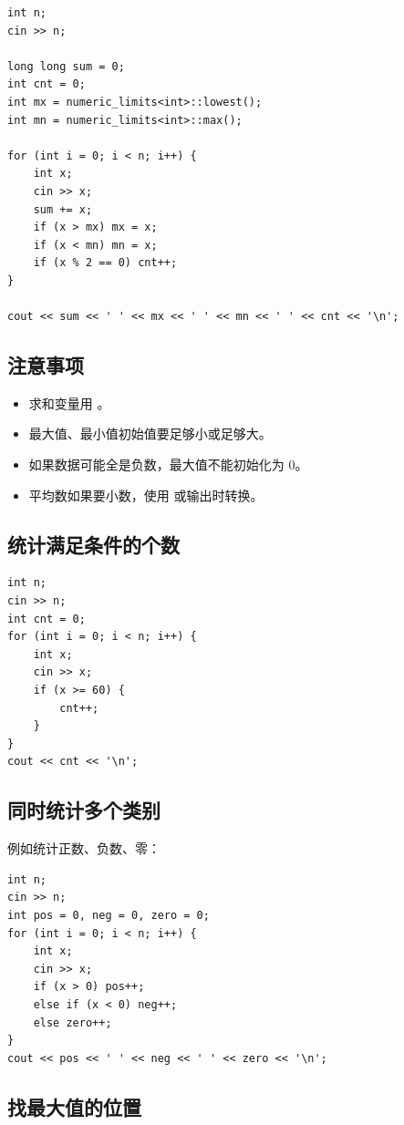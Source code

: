 \begin{lstlisting}
int n;
cin >> n;

long long sum = 0;
int cnt = 0;
int mx = numeric_limits<int>::lowest();
int mn = numeric_limits<int>::max();

for (int i = 0; i < n; i++) {
    int x;
    cin >> x;
    sum += x;
    if (x > mx) mx = x;
    if (x < mn) mn = x;
    if (x % 2 == 0) cnt++;
}

cout << sum << ' ' << mx << ' ' << mn << ' ' << cnt << '\n';
\end{lstlisting}

\subsection{注意事项}

\begin{itemize}
  \item 求和变量用 。
  \item 最大值、最小值初始值要足够小或足够大。
  \item 如果数据可能全是负数，最大值不能初始化为 0。
  \item 平均数如果要小数，使用  或输出时转换。
\end{itemize}

\subsection{统计满足条件的个数}

\begin{lstlisting}
int n;
cin >> n;
int cnt = 0;
for (int i = 0; i < n; i++) {
    int x;
    cin >> x;
    if (x >= 60) {
        cnt++;
    }
}
cout << cnt << '\n';
\end{lstlisting}

\subsection{同时统计多个类别}

例如统计正数、负数、零：

\begin{lstlisting}
int n;
cin >> n;
int pos = 0, neg = 0, zero = 0;
for (int i = 0; i < n; i++) {
    int x;
    cin >> x;
    if (x > 0) pos++;
    else if (x < 0) neg++;
    else zero++;
}
cout << pos << ' ' << neg << ' ' << zero << '\n';
\end{lstlisting}

\subsection{找最大值的位置}

